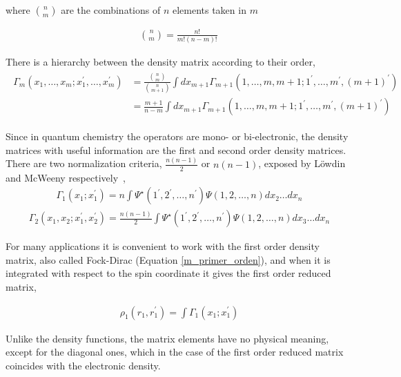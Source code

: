 \noindent where ${n \choose m}$ are the combinations of $n$ elements taken in
$m$
 
%
\small
\begin{align}
  {n \choose m} = \frac{n!}{m! (n-m)!}\, 
\end{align}
\normalsize

There is a hierarchy between the density matrix 
according to their order,
\small
\begin{align}
  \begin{split}
  \Gamma_{m}(x_{1}, \ldots , x_{m}; x^{\prime}_{1}, \ldots , x^{\prime}_{m}) & = \frac{{n \choose m}}{{n \choose {m+1}}}
  \int dx_{m+1}\Gamma_{m+1}(1, \ldots , m, m+1;1^{\prime}, \ldots , m^{\prime}, (m+1)^{\prime}) \\
	  & = \frac{m+1}{n-m} \int dx_{m+1}\Gamma_{m+1}(1, \ldots , m, m+1;1^{\prime}, \ldots , m^{\prime}, (m+1)^{\prime})
  \end{split}
\end{align}
\normalsize

Since in quantum chemistry the operators are mono- or bi-electronic, the
density matrices with useful information are the first and second order density
matrices. There are two normalization criteria, $\frac{n(n-1)}{2}$ or $n(n-1)$,
exposed by L\"owdin and McWeeny  respectively~\cite{Lwdin1955,mcweeny},
%
\begin{align}
  \Gamma_{1} (x_1;x_1^{\prime}) = n\int\Psi^{\star}(1^{\prime}, 2^{\prime}, \ldots ,n^{\prime})\Psi(1, 2, \ldots , n) dx_{2} \ldots dx_{n}
\label{m_primer_orden}
\end{align}
\begin{align}
  \Gamma_{2} (x_{1}, x_{2};x^{\prime}_{1},x^{\prime}_{2}) = \frac{n(n-1)}{2} \int\Psi^{\star}(1^{\prime}, 2^{\prime}, \ldots ,n^{\prime})
  \Psi(1, 2, \ldots , n) dx_{3} \ldots dx_{n}
\end{align}

For many applications it is convenient to work with the first order density
matrix, also called Fock-Dirac (Equation \ref{m_primer_orden}), and when it is
integrated with respect to the spin coordinate it gives the first order reduced
matrix,

%
\begin{align}
  \rho_{1}(r_{1},r^{\prime}_{1}) = \int\Gamma_{1} (x_{1};x_{1}^{\prime})
\label{m_r_1}
\end{align}

\noindent Unlike the density functions, the matrix elements have no physical
meaning, except for the diagonal ones, which in the case of the first order
reduced matrix coincides with the electronic density.

